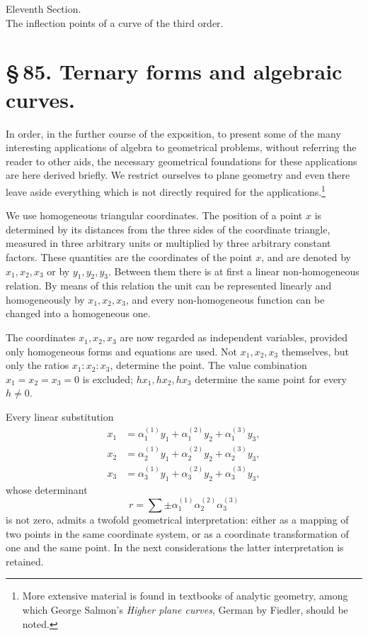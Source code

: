 \documentclass[11pt]{article}
\begin{document}
\begin{center}
{\large Eleventh Section.}\\[0.4em]
{\large The inflection points of a curve of the third order.}
\end{center}

\section*{\S\,85. Ternary forms and algebraic curves.}

In order, in the further course of the exposition, to present some of the many interesting applications of algebra to geometrical problems, without referring the reader to other aids, the necessary geometrical foundations for these applications are here derived briefly. We restrict ourselves to plane geometry and even there leave aside everything which is not directly required for the applications.\footnote{More extensive material is found in textbooks of analytic geometry, among which George Salmon's \emph{Higher plane curves}, German by Fiedler, should be noted.}

We use homogeneous triangular coordinates. The position of a point $x$ is determined by its distances from the three sides of the coordinate triangle, measured in three arbitrary units or multiplied by three arbitrary constant factors. These quantities are the coordinates of the point $x$, and are denoted by $x_1,x_2,x_3$ or by $y_1,y_2,y_3$. Between them there is at first a linear non-homogeneous relation. By means of this relation the unit can be represented linearly and homogeneously by $x_1,x_2,x_3$, and every non-homogeneous function can be changed into a homogeneous one.

The coordinates $x_1,x_2,x_3$ are now regarded as independent variables, provided only homogeneous forms and equations are used. Not $x_1,x_2,x_3$ themselves, but only the ratios $x_1:x_2:x_3$, determine the point. The value combination $x_1=x_2=x_3=0$ is excluded; $hx_1,hx_2,hx_3$ determine the same point for every $h\ne0$.

Every linear substitution
\begin{equation}
\begin{aligned}
 x_1&=\alpha^{(1)}_1y_1+\alpha^{(2)}_1y_2+\alpha^{(3)}_1y_3,\\
 x_2&=\alpha^{(1)}_2y_1+\alpha^{(2)}_2y_2+\alpha^{(3)}_2y_3,\\
 x_3&=\alpha^{(1)}_3y_1+\alpha^{(2)}_3y_2+\alpha^{(3)}_3y_3,
\end{aligned}
\tag{1}
\end{equation}
whose determinant
\begin{equation}
 r=\sum \pm \alpha^{(1)}_1\alpha^{(2)}_2\alpha^{(3)}_3
 \tag{2}
\end{equation}
is not zero, admits a twofold geometrical interpretation: either as a mapping of two points in the same coordinate system, or as a coordinate transformation of one and the same point. In the next considerations the latter interpretation is retained.
\end{document}
